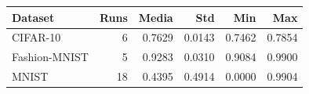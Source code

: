 \begin{tabular}{lrrrrr}
\toprule
Dataset & Runs & Media & Std & Min & Max \\
\midrule
CIFAR-10 & 6 & 0.7629 & 0.0143 & 0.7462 & 0.7854 \\
Fashion-MNIST & 5 & 0.9283 & 0.0310 & 0.9084 & 0.9900 \\
MNIST & 18 & 0.4395 & 0.4914 & 0.0000 & 0.9904 \\
\bottomrule
\end{tabular}